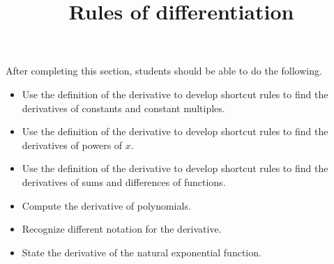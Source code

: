 \documentclass{ximera}
\title{Rules of differentiation}
\begin{document}
\begin{abstract}
\end{abstract}

\maketitle

\begin{sectionOutcomes}

After completing this section, students should be able to do the following.

\begin{itemize}
	\item Use the definition of the derivative to develop shortcut rules to find the derivatives of constants and constant multiples.
	\item Use the definition of the derivative to develop shortcut rules to find the derivatives of powers of $x$.
	\item Use the definition of the derivative to develop shortcut rules to find the derivatives of sums and differences of functions.
        \item Compute the derivative of polynomials.
        \item Recognize different notation for the derivative.
        \item State the derivative of the natural exponential function.
\end{itemize}

\end{sectionOutcomes}
\end{document}
